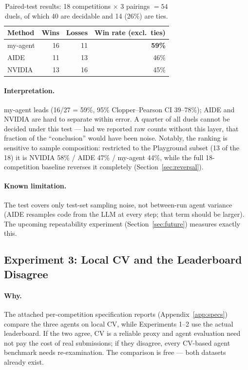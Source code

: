 \documentclass[11pt,a4paper]{article}
\begin{document}
\begin{table}[htbp]
\centering\small
\caption{Paired-test results: 18 competitions $\times$ 3 pairings $= 54$ duels, of which 40 are decidable and 14 (26\%) are ties.}
\label{tab:winrates}
\begin{tabular}{@{}lrrr@{}}
\toprule
\textbf{Method} & \textbf{Wins} & \textbf{Losses} & \textbf{Win rate (excl.\ ties)} \\
\midrule
my-agent & 16 & 11 & \textbf{59\%} \\
AIDE     & 11 & 13 & 46\% \\
NVIDIA   & 13 & 16 & 45\% \\
\bottomrule
\end{tabular}
\end{table}

\paragraph{Interpretation.} my-agent leads (16/27 = 59\%, 95\% Clopper--Pearson CI 39--78\%); AIDE and NVIDIA are hard to separate within error. A quarter of all duels cannot be decided under this test --- had we reported raw counts without this layer, that fraction of the ``conclusion'' would have been noise. Notably, the ranking is sensitive to sample composition: restricted to the Playground subset (13 of the 18) it is NVIDIA 58\% / AIDE 47\% / my-agent 44\%, while the full 18-competition baseline reverses it completely (Section~\ref{sec:reversal}).

\paragraph{Known limitation.} The test covers only test-set sampling noise, not between-run agent variance (AIDE resamples code from the LLM at every step; that term should be larger). The upcoming repeatability experiment (Section~\ref{sec:future}) measures exactly this.

\subsection{Experiment 3: Local CV and the Leaderboard Disagree}
\label{sec:exp3}

\paragraph{Why.} The attached per-competition specification reports (Appendix~\ref{app:specs}) compare the three agents on local CV, while Experiments 1--2 use the actual leaderboard. If the two agree, CV is a reliable proxy and agent evaluation need not pay the cost of real submissions; if they disagree, every CV-based agent benchmark needs re-examination. The comparison is free --- both datasets already exist.
\end{document}
